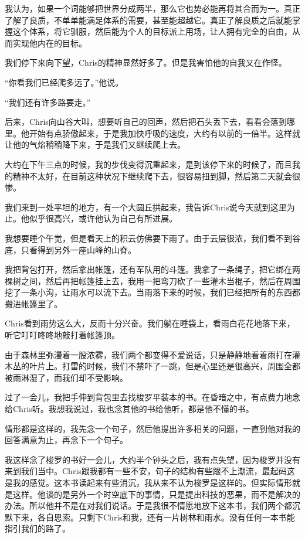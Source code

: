 \documentclass[UTF8]{article}
\begin{document}
\par 我认为，如果一个词能够把世界分成两半，那么它也势必能再将其合而为一。真正了解了良质，不单单能满足体系的需要，甚至能超越它。真正了解良质之后就能掌握这个体系，将它驯服，然后能为个人的目标派上用场，让人拥有完全的自由，从而实现他内在的目标。
\par 我们停下来向下望，Chris的精神显然好多了。但是我害怕他的自我又在作怪。
\par “你看我们已经爬多远了。”他说。
\par “我们还有许多路要走。”
\par 后来，Chris向山谷大叫，想要听自己的回声，然后把石头丢下去，看看会落到哪里。他开始有点骄傲起来，于是我加快呼吸的速度，大约有以前的一倍半。这样就让他的气焰稍稍降下来，于是我们又继续爬上去。
\par 大约在下午三点的时候，我的步伐变得沉重起来，是到该停下来的时候了，而且我的精神不太好，在目前这种状况下继续爬下去，很容易扭到脚，然后第二天就会很惨。
\par 我们来到一处平坦的地方，有一个大圆丘拱起来，我告诉Chris说今天就到这里为止。他似乎很高兴，或许他认为自己有所进展。
\par 我想要睡个午觉，但是看天上的积云仿佛要下雨了。由于云层很浓，我们看不到谷底，只看得到另外一座山峰的山脊。
\par 我把背包打开，然后拿出帐篷，还有军队用的斗篷。我拿了一条绳子，把它绑在两棵树之间，然后再把帐篷挂上去，我用一把弯刀砍了一些灌木当棍子，然后在周围挖了一条小沟，让雨水可以流下去。当雨落下来的时候，我们已经把所有的东西都搬进帐篷里了。
\par Chris看到雨势这么大，反而十分兴奋。我们躺在睡袋上，看雨白花花地落下来，听它叮叮咚咚地敲打着帐篷顶。
\par 由于森林里弥漫着一股浓雾，我们两个都变得不爱说话，只是静静地看着雨打在灌木丛的叶片上。打雷的时候，我们不禁吓了一跳，但是心里还是很高兴，周围全都被雨淋湿了，而我们却不受影响。
\par 过了一会儿，我把手伸到背包里去找梭罗平装本的书。在昏暗之中，有点费力地念给Chris听。我想我说过，我也念其他的书给他听，都是他不懂的书。
\par 情形都是这样的，我先念一个句子，然后他提出许多相关的问题，一直到他对我的回答满意为止，再念下一个句子。
\par 我这样念了梭罗的书好一会儿，大约半个钟头之后，我有点失望，因为梭罗并没有来到我们当中。Chris跟我都有一些不安，句子的结构有些跟不上潮流，最起码这是我的感觉。这本书读起来有些消沉，我从来不认为梭罗是这样的。但实际情形就是这样。他谈的是另外一个时空底下的事情，只是提出科技的恶果，而不是解决的办法。所以他并不是在对我们说话。于是我很不情愿地放下这本书，我们两个都沉默下来，各自思索。只剩下Chris和我，还有一片树林和雨水。没有任何一本书能指引我们的路了。
\end{document}

